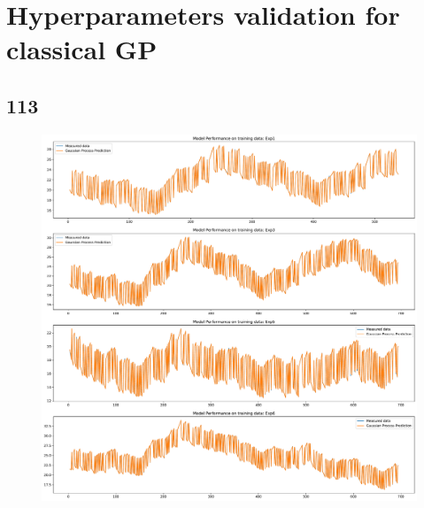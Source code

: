 \clearpage

\section{Hyperparameters validation for classical GP}

\subsection{113}

\begin{figure}[ht]
    \centering
    \includegraphics[width = \textwidth]{Plots/GP_113_training_performance.pdf}
    \caption{}
    \label{fig:GP_train_validation}
\end{figure}

